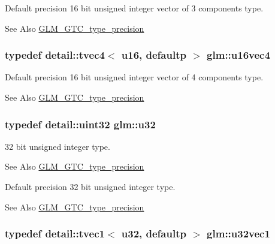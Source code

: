 Default precision 16 bit unsigned integer vector of 3 components type. \begin{DoxySeeAlso}{See Also}
\hyperlink{group__gtc__type__precision}{G\-L\-M\-\_\-\-G\-T\-C\-\_\-type\-\_\-precision} 
\end{DoxySeeAlso}
\hypertarget{group__gtc__type__precision_gaac02cce8820bcdbbeea9659aeaa718fb}{
\subsubsection[{u16vec4}]{\setlength{\rightskip}{0pt plus 5cm}typedef detail\-::tvec4$<$ u16, defaultp $>$ {\bf glm\-::u16vec4}}}\label{group__gtc__type__precision_gaac02cce8820bcdbbeea9659aeaa718fb}
Default precision 16 bit unsigned integer vector of 4 components type. \begin{DoxySeeAlso}{See Also}
\hyperlink{group__gtc__type__precision}{G\-L\-M\-\_\-\-G\-T\-C\-\_\-type\-\_\-precision} 
\end{DoxySeeAlso}
\hypertarget{group__gtc__type__precision_ga54e837745059fd29017bed71cfa0a8db}{
\subsubsection[{u32}]{\setlength{\rightskip}{0pt plus 5cm}typedef detail\-::uint32 {\bf glm\-::u32}}}\label{group__gtc__type__precision_ga54e837745059fd29017bed71cfa0a8db}
32 bit unsigned integer type. \begin{DoxySeeAlso}{See Also}
\hyperlink{group__gtc__type__precision}{G\-L\-M\-\_\-\-G\-T\-C\-\_\-type\-\_\-precision}
\end{DoxySeeAlso}
Default precision 32 bit unsigned integer type. \begin{DoxySeeAlso}{See Also}
\hyperlink{group__gtc__type__precision}{G\-L\-M\-\_\-\-G\-T\-C\-\_\-type\-\_\-precision} 
\end{DoxySeeAlso}
\hypertarget{group__gtc__type__precision_gac8263c8c0bb36bc5c3d109f508e0fb41}{
\subsubsection[{u32vec1}]{\setlength{\rightskip}{0pt plus 5cm}typedef detail\-::tvec1$<$ u32, defaultp $>$ {\bf glm\-::u32vec1}}}\label{group__gtc__type__precision_gac8263c8c0bb36bc5c3d109f508e0fb41}
